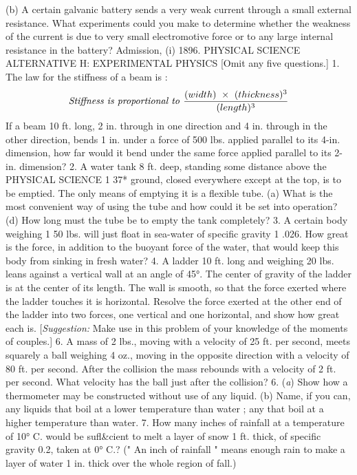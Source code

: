 (b) A certain galvanic battery sends a very weak current through a small external resistance. What experiments could you make to determine whether the weakness of the current is due to very small electromotive force or to any large internal resistance in the battery?
Admission, (i) 1896.
PHYSICAL SCIENCE ALTERNATIVE H: EXPERIMENTAL PHYSICS
[Omit any five questions.]
1. The law for the stiffness of a beam is :
$$\mbox{\emph{Stiffness is proportional to }} \frac{(width)\ \times\ (thickness)^3}{(length)^3}$$
If a beam 10 ft. long, 2 in. through in one direction and 4 in. through in the other direction, bends 1 in. under a force of 500 lbs. applied parallel to its 4-in. dimension, how far would it bend under the same force applied parallel to its 2-in. dimension?
2. A water tank 8 ft. deep, standing some distance above the
PHYSICAL SCIENCE 1 37*
ground, closed everywhere except at the top, is to be emptied. The only means of emptying it is a flexible tube.
(a) What is the most convenient way of using the tube and how could it be set into operation?
(d) How long must the tube be to empty the tank completely?
3. A certain body weighing 1 50 lbs. will just float in sea-water of specific gravity 1 .026. How great is the force, in addition to the buoyant force of the water, that would keep this body from sinking in fresh water?
4. A ladder 10 ft. long and weighing 20 lbs. leans against a vertical wall at an angle of 45°. The center of gravity of the ladder is at the center of its length. The wall is smooth, so that the force exerted where the ladder touches it is horizontal. Resolve the force exerted at the other end of the ladder into two forces, one vertical and one horizontal, and show how great each is.
[\emph{Suggestion: } Make use in this problem of your knowledge of the moments of couples.]
6. A mass of 2 lbs., moving with a velocity of 25 ft. per second, meets squarely a ball weighing 4 oz., moving in the opposite direction with a velocity of 80 ft. per second. After the collision the mass rebounds with a velocity of 2 ft. per second. What velocity has the ball just after the collision?
6. (\emph{a}) Show how a thermometer may be constructed without use of any liquid.
(b) Name, if you can, any liquids that boil at a lower temperature than water ; any that boil at a higher temperature than water.
7. How many inches of rainfall at a temperature of 10° C. would be sufl&cient to melt a layer of snow 1 ft. thick, of specific gravity 0.2, taken at 0° C.?
(" An inch of rainfall " means enough rain to make a layer of water 1 in. thick over the whole region of fall.)
